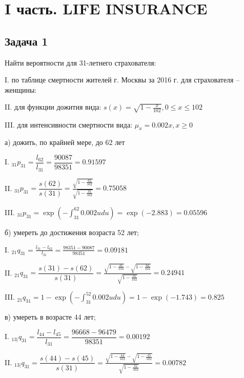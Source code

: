 \documentclass[12pt,a4paper, oneside]{extreport}
\begin{document}



\section*{I часть. LIFE INSURANCE}





\subsection*{Задача 1}

Найти вероятности  для 31-летнего страхователя:

I. по таблице смертности жителей г. Москвы за 2016 г. для  
страхователя – женщины:

II. для функции дожития вида:  $s(x) = \sqrt{1-\frac{x}{102}},  
0 \leq x \leq 102 $

III.  для интенсивности  смертности вида: $\mu_x = 0.002x, x\geq 0$



а) дожить, по крайней мере, до 62 лет

I. $_{31}p_{31} = \dfrac{l_{62}}{l_{31}} = \dfrac{90087}{98351} = 0.91597$  

II. $_{31}p_{31} = \dfrac{s(62)}{s(31)} = \frac{\sqrt{1-\frac{62}{102}}}{\sqrt{1-\frac{31}{102}}} = 0.75058$  


III. $_{31}p_{31} =  \exp(-\int_{31}^{62} 0.002u  du  )  = \exp(-2.883)  = 0.05596$  
 

б) умереть до достижения возраста 52 лет;

I. $_{21}q_{31} = \frac{l_{31} - l_{62}}{l_{31}} = \frac{98351-90087}{98351} = 0.09181$  

II. $_{21}q_{31} = \dfrac{s(31) - s(62)}{s(31)} = \frac{\sqrt{1-\frac{31}{102}}-\sqrt{1-\frac{62}{102}}}{\sqrt{1-\frac{31}{102}}} = 0.24941$  


III. $_{21}q_{31} = 1 - \exp(-\int_{31}^{52} 0.002u du  )  = 1 -  \exp(-1.743)  = 0.825   $  
 


в) умереть в возрасте 44 лет;

I. $_{13|}q_{31} = \dfrac{l_{44} - l_{45}}{l_{31}} = \dfrac{96668-96479}{98351} = 0.00192$  

II. $_{13|}q_{31} = \dfrac{s(44) - s(45)}{s(31)} = \frac{\sqrt{1-\frac{44}{102}}-\sqrt{1-\frac{45}{102}}}{\sqrt{1-\frac{31}{102}}} = 0.00782$  
\end{document}
